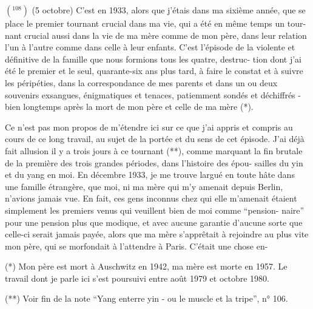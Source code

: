 \(({}^{108})\) (5 octobre) C'est en 1933, alors que j'étais dans ma sixième année, que se
place le premier tournant crucial dans ma vie, qui a été en même temps un tour-\newline
nant crucial aussi dans la vie de ma mère comme de mon père, dans leur relation
l'un à l'autre comme dans celle à leur enfants. C'est l'épisode de la 
violente et définitive de la famille que nous formions tous les quatre, destruc-\newline
tion dont j'ai été le premier et le seul, quarante-six ans plus tard, à faire le
constat et à suivre les péripéties, dans la correspondance de mes parents et
dans un ou deux souvenirs exsangues, énigmatiques et tenaces, patiemment sondés
et déchiffrés - bien longtemps après la mort de mon père et celle de ma mère (*).

Ce n'est pas mon propos de m'étendre ici sur ce que j'ai appris et compris
au cours de ce long travail, au sujet de la portée et du sens de cet épisode.
J'ai déjà fait allusion il y a trois jours à ce tournant (**), comme marquant la
fin brutale de la première des trois grandes périodes, dans l'histoire des épou-\newline
sailles du yin et du yang en moi. En décembre 1933, je me trouve largué en toute
hâte dans une famille étrangère, que moi, ni ma mère qui m'y amenait depuis
Berlin, n'avions jamais vue. En fait, ces gens inconnus chez qui elle m'amenait
étaient simplement les premiers venus qui veuillent bien de moi comme ``pension-\newline
naire'' pour une pension plus que modique, et avec aucune garantie d'aucune sorte
que celle-ci serait jamais payée, alors que ma mère s'apprêtait à rejoindre au
plus vite mon père, qui se morfondait à l'attendre à Paris. C'était une chose en-

(*) Mon père est mort à Auschwitz en 1942, ma mère est morte en 1957. Le travail
dont je parle ici s'est poursuivi entre août 1979 et octobre 1980.

(**) Voir fin de la note ``Yang enterre yin - ou le muscle et la tripe'', n° 106.


